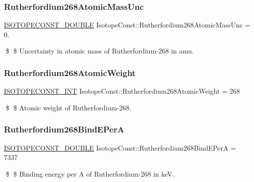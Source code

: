 \subsubsection{\texorpdfstring{Rutherfordium268\+Atomic\+Mass\+Unc}{Rutherfordium268AtomicMassUnc}}
{\footnotesize\ttfamily \mbox{\hyperlink{group___isotope_const-_macros_ga8f45a7272ce02c0b4c65c44636ed719a}{I\+S\+O\+T\+O\+P\+E\+C\+O\+N\+S\+T\+\_\+\+D\+O\+U\+B\+LE}} Isotope\+Const\+::\+Rutherfordium268\+Atomic\+Mass\+Unc = 0.}

\$ \$ Uncertainty in atomic mass of Rutherfordium-\/268 in amu. \mbox{\label{group___isotope_const-_rutherfordium-_rf268_gaf2c69f69dcfbe4c9998ef75584c32c88}} 
\subsubsection{\texorpdfstring{Rutherfordium268\+Atomic\+Weight}{Rutherfordium268AtomicWeight}}
{\footnotesize\ttfamily \mbox{\hyperlink{group___isotope_const-_macros_ga5f18360b3e99483a35c32d789e62621c}{I\+S\+O\+T\+O\+P\+E\+C\+O\+N\+S\+T\+\_\+\+I\+NT}} Isotope\+Const\+::\+Rutherfordium268\+Atomic\+Weight = 268}

\$ \$ Atomic weight of Rutherfordium-\/268. \mbox{\label{group___isotope_const-_rutherfordium-_rf268_ga79ac29784f720f3ec55848d184e8caef}} 
\subsubsection{\texorpdfstring{Rutherfordium268\+Bind\+E\+PerA}{Rutherfordium268BindEPerA}}
{\footnotesize\ttfamily \mbox{\hyperlink{group___isotope_const-_macros_ga8f45a7272ce02c0b4c65c44636ed719a}{I\+S\+O\+T\+O\+P\+E\+C\+O\+N\+S\+T\+\_\+\+D\+O\+U\+B\+LE}} Isotope\+Const\+::\+Rutherfordium268\+Bind\+E\+PerA = 7337}

\$ \$ Binding energy per A of Rutherfordium-\/268 in keV. \mbox{\label{group___isotope_const-_rutherfordium-_rf268_gabaab64258960122395917eae2e34cabc}} 
